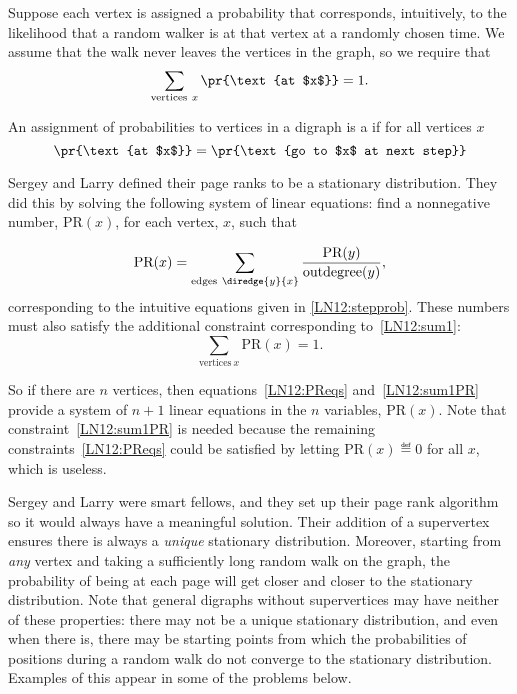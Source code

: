 Suppose each vertex is assigned a probability that corresponds, intuitively,
to the likelihood that a random walker is at that vertex at a randomly
chosen time.  We assume that the walk never leaves the vertices in the graph,
so we require that
\begin{equation}\label{LN12:sum1}
\sum_{\text{vertices}\ x} \pr{\text{at $x$}} = 1.
\end{equation}

\begin{definition} An assignment of probabilities to vertices in a digraph
  is a  if for all vertices $x$
\[
\pr{\text{at $x$}} = \pr{\text{go to $x$ at next step}}
\]
\end{definition}  

Sergey and Larry defined their page ranks to be a stationary distribution.
They did this by solving the following system of linear equations: find a
nonnegative number, $\text{PR}(x)$, for each vertex, $x$, such that

\begin{equation}\label{LN12:PReqs}
\text{PR}(x) = \sum_{\text{edges}\ \diredge{y}{x}} \frac{\text{PR}(y)}{\text{outdegree}(y)},
\end{equation}
corresponding to the intuitive equations given in \eqref{LN12:stepprob}.
These numbers must also satisfy the additional constraint corresponding
to~\eqref{LN12:sum1}:
\begin{equation}\label{LN12:sum1PR}
\sum_{\text{vertices}\ x} \text{PR}(x) = 1.
\end{equation}

So if there are $n$ vertices, then equations~\eqref{LN12:PReqs}
and~\eqref{LN12:sum1PR} provide a system of $n+1$ linear equations in the
$n$ variables, $\text{PR}(x)$.  Note that constraint~\eqref{LN12:sum1PR}
is needed because the remaining constraints~\eqref{LN12:PReqs} could be
satisfied by letting $\text{PR}(x)\eqdef 0$ for all $x$, which is useless.

Sergey and Larry were smart fellows, and they set up their page rank
algorithm so it would always have a meaningful solution.  Their addition
of a supervertex ensures there is always a \emph{unique} stationary
distribution.  Moreover, starting from \emph{any} vertex and taking a
sufficiently long random walk on the graph, the probability of being at
each page will get closer and closer to the stationary distribution.  Note
that general digraphs without supervertices may have neither of these
properties: there may not be a unique stationary distribution, and even
when there is, there may be starting points from which the probabilities
of positions during a random walk do not converge to the stationary
distribution.  Examples of this appear in some of the problems below.

